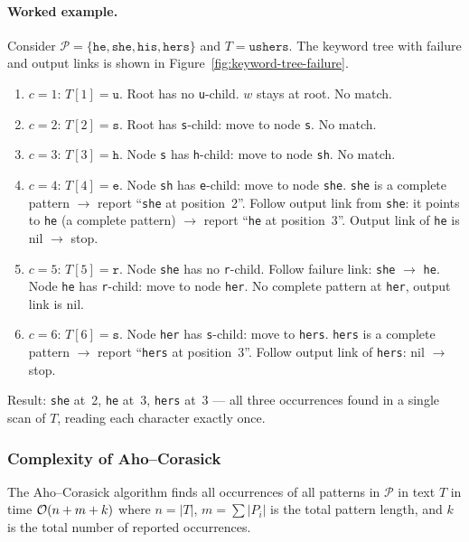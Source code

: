 \paragraph{Worked example.}
Consider $\mathcal{P} = \{\texttt{he},\texttt{she},\texttt{his},
\texttt{hers}\}$ and $T = \texttt{ushers}$.
The keyword tree with failure and output links is shown in
Figure~\ref{fig:keyword-tree-failure}.

\begin{enumerate}[nosep]
  \item $c=1$: $T[1] = \texttt{u}$.  Root has no \texttt{u}-child.
        $w$ stays at root.  No match.
  \item $c=2$: $T[2] = \texttt{s}$.  Root has \texttt{s}-child: move
        to node \texttt{s}.  No match.
  \item $c=3$: $T[3] = \texttt{h}$.  Node \texttt{s} has
        \texttt{h}-child: move to node \texttt{sh}.  No match.
  \item $c=4$: $T[4] = \texttt{e}$.  Node \texttt{sh} has
        \texttt{e}-child: move to node \texttt{she}.
        \texttt{she} is a complete pattern $\to$ report
        ``\texttt{she} at position~2''.
        Follow output link from \texttt{she}: it points to \texttt{he}
        (a complete pattern) $\to$ report ``\texttt{he} at position~3''.
        Output link of \texttt{he} is nil $\to$ stop.
  \item $c=5$: $T[5] = \texttt{r}$.
        Node \texttt{she} has no \texttt{r}-child.
        Follow failure link: \texttt{she} $\to$ \texttt{he}.
        Node \texttt{he} has \texttt{r}-child: move to node \texttt{her}.
        No complete pattern at \texttt{her}, output link is nil.
  \item $c=6$: $T[6] = \texttt{s}$.
        Node \texttt{her} has \texttt{s}-child: move to \texttt{hers}.
        \texttt{hers} is a complete pattern $\to$ report
        ``\texttt{hers} at position~3''.
        Follow output link of \texttt{hers}: nil $\to$ stop.
\end{enumerate}

Result: \texttt{she} at~2, \texttt{he} at~3, \texttt{hers} at~3 ---
all three occurrences found in a single scan of $T$, reading each
character exactly once.

\subsubsection{Complexity of Aho--Corasick}

\begin{theorem}
  \label{thm:ac-complexity}
  The Aho--Corasick algorithm finds all occurrences of all patterns in
  $\mathcal{P}$ in text $T$ in time
  $\mathcal{O}\!\left(n + m + k\right)$
  where $n = |T|$, $m = \sum |P_i|$ is the total pattern length, and
  $k$ is the total number of reported occurrences.
\end{theorem}

